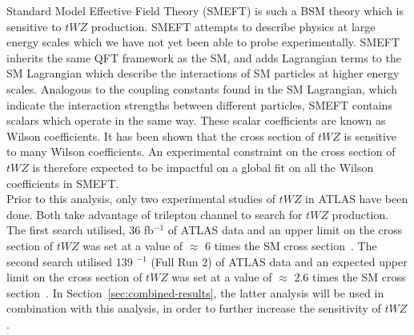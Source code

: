 Standard Model Effective Field Theory (SMEFT) is such a BSM theory which is sensitive to $tWZ$ production. SMEFT attempts to describe physics at large energy scales which we have not yet been able to probe experimentally. SMEFT inherits the same QFT framework as the SM, and adds Lagrangian terms to the SM Lagrangian which describe the interactions of SM particles at higher energy scales. Analogous to the coupling constants found in the SM Lagrangian, which indicate the interaction strengths between different particles, SMEFT contains scalars which operate in the same way. These scalar coefficients are known as Wilson coefficients. It has been shown that the cross section of $tWZ$ is sensitive to many Wilson coefficients. An experimental constraint on the cross section of $tWZ$ is therefore expected to be impactful on a global fit on all the Wilson coefficients in SMEFT.\\

Prior to this analysis, only two experimental studies of $tWZ$ in ATLAS have been done. Both take advantage of trilepton channel to search for $tWZ$ production. The first search utilised, 36 fb$^{-1}$ of ATLAS data and an upper limit on the cross section of $tWZ$ was set at a value of $\approx$ 6 times the SM cross section~\cite{twz_3_lep}. The second search utilised 139 $^{-1}$ (Full Run 2) of ATLAS data and an expected upper limit on the cross section of $tWZ$ was set at a value of $\approx$ 2.6 times the SM cross section~\cite{ben-thesis}. In Section~\ref{sec:combined-results}, the latter analysis will be used in combination with this analysis, in order to further increase the sensitivity of $tWZ$.



